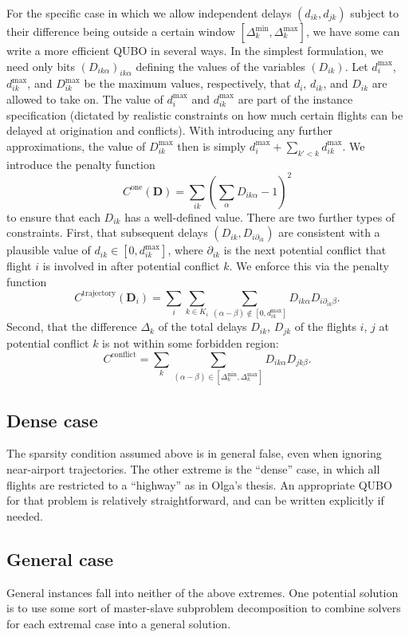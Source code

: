 \documentclass{article}
\begin{document}
For the specific case in which we allow independent delays $(d_{ik}, d_{jk})$ subject to their difference being outside a certain window $[\Delta_k^{\mathrm{min}}, \Delta_k^{\mathrm{max}}]$, we have some can write a more efficient QUBO in several ways. 
In the simplest formulation, we need only bits $\left(D_{ik\alpha}\right)_{ik\alpha}$ defining the values of the variables $\left(D_{ik}\right)$. 
Let $d_i^{\mathrm{max}}$, $d_{ik}^{\mathrm{max}}$, and $D_{ik}^{\mathrm{max}}$ be the maximum values, respectively, that $d_i$, $d_{ik}$, and $D_{ik}$ are allowed to take on.
The value of $d_i^{\mathrm{max}}$ and $d_{ik}^{\mathrm{max}}$ are part of the instance specification (dictated by realistic constraints on how much certain flights can be delayed at origination and conflicts).
With introducing any further approximations, the value of $D_{ik}^{\mathrm{max}}$ then is simply $d_{i}^{\mathrm{max}} + \sum_{k' < k} d_{ik}^{\mathrm{max}}$.
We introduce the penalty function
\begin{equation*}
C^{\mathrm{one}}(\mathbf D)
= \sum_{ik} \left(\sum_{\alpha} D_{ik\alpha} - 1\right)^2
\end{equation*}
to ensure that each $D_{ik}$ has a well-defined value.
There are two further types of constraints.
First, that subsequent delays $(D_{ik}, D_{i\partial_{ik}})$ are consistent with a plausible value of $d_{ik} \in [0, d_{ik}^{\mathrm{max}}]$, where $\partial_{ik}$ is the next potential conflict that flight $i$ is involved in after potential conflict $k$.
We enforce this via the penalty function
\begin{equation*}
C^{\mathrm{trajectory}}
(\mathbf D_i)
=
\sum_i \sum_{k \in K_i}
\sum_{(\alpha - \beta) \notin [0, d_{ik}^{\mathrm{max}}]}
D_{ik\alpha} D_{i \partial_{ik} \beta}.
\end{equation*}
Second, that the difference $\Delta_k$ of the total delays $D_{ik}$, $D_{jk}$ of the flights $i$, $j$ at potential conflict $k$ is not within some forbidden region:
\begin{equation*}
C^{\mathrm{conflict}}
= \sum_k \sum_{(\alpha - \beta) \in [\Delta_k^{\mathrm{min}}, \Delta_k^{\mathrm{max}}]} D_{ik\alpha} D_{jk\beta}.
\end{equation*}

% 

\subsection{Dense case}
The sparsity condition assumed above is in general false, even when ignoring near-airport trajectories.
The other extreme is the ``dense'' case, in which all flights are restricted to a ``highway'' as in Olga's thesis.
An appropriate QUBO for that problem is relatively straightforward, and can be written explicitly if needed.

\subsection{General case}
General instances fall into neither of the above extremes.
One potential solution is to use some sort of master-slave subproblem decomposition to combine solvers for each extremal case into a general solution.
\end{document}
